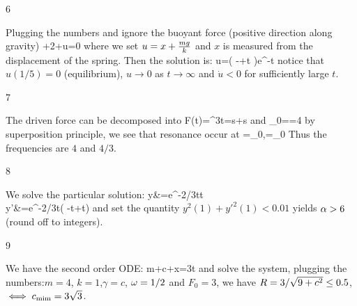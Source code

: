 \begin{vv286_mp}{6}
\item[]
	Plugging the numbers and ignore the buoyant force (positive direction along gravity)
	\eq
	{
	+2+u=0
	}
	where we set $u=x+\frac{mg}{k}$ and $x$ is measured from the displacement of the spring.
	Then the solution is:
	\eq
	{
	u=\left( -+t \right)e^{-t}
	}
	notice that $u(1/5)=0$ (equilibrium), $u\to0$ as $t\to\infty$ and $\dot{u}<0$ for sufficiently large $t$.
\end{vv286_mp}
\begin{vv286_ms}{7}
\item[]
	The driven force can be decomposed into 
	\eq
	{
		F(t)=\cos^3\w t=\w s+\cos\w s
	}
	and
	\eq
	{
		\w_0==4
	}
	by superposition principle, we see that resonance occur at
	\eq
	{
		\w=\w_0,\w=\w_0
	}  
	Thus the frequencies are $4$ and $4/3$.
\end{vv286_ms}
\begin{vv286_ms}{8}
\item[]
	We solve the particular solution:
	\eq
	{
	y&=e^{-2/3t}\sin {}\a t\\
	y'&=e^{-2/3t}\left( -\sin {}\a t+\cos {}\a t\right)
	}
	and set the quantity $y^2(1)+y'^2(1)<0.01$ yields $\alpha>6$ (round off to integers).
\end{vv286_ms}
\begin{vv286_ms}{9}
\item[]
	We have the second order ODE:
	\eq
	{
	m+c+x=3\cos t
	}
	and solve the system, plugging the numbers:$m=4$, $k=1$,$\gamma=c$, $\omega=1/2$ and $F_0=3$, we
	have $R=3/\sqrt{9+c^2}\leq0.5$, $\iff c_{\rm mim}=3\sqrt{3}$.
\end{vv286_ms}











